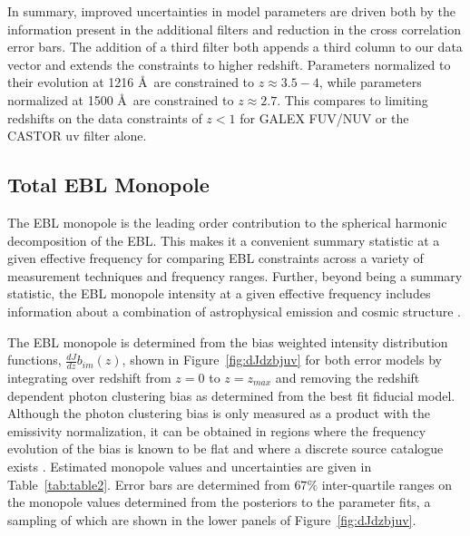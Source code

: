 \documentclass[fleqn,usenatbib]{mnras}
\begin{document}
In summary, improved uncertainties in model parameters are driven both by the information present in the additional filters and reduction in the cross correlation error bars. The addition of a third filter both appends a third column to our data vector and extends the constraints to higher redshift. Parameters normalized to their evolution at 1216 \AA\ are constrained to $z\approx 3.5-4$, while parameters normalized at 1500 \AA\ are constrained to $z\approx 2.7$. This compares to limiting redshifts on the data constraints of $z<1$ for {\small GALEX} FUV/NUV or the {\small CASTOR} uv filter alone. 



\subsection{Total EBL Monopole} 
\label{EBL}


The EBL monopole is the leading order contribution to the spherical harmonic decomposition of the EBL. This makes it a convenient summary statistic at a given effective frequency for comparing EBL constraints across a variety of measurement techniques and frequency ranges.  Further, beyond being a summary statistic, the EBL monopole intensity at a given effective frequency includes information about a combination of astrophysical emission and cosmic structure \citep{Hill2018}. 

The EBL monopole is determined from the bias weighted intensity distribution functions, $\frac{dJ}{dz}b_{im} (z)$, shown in Figure~\ref{fig:dJdzbjuv} for both error models by integrating over redshift from $z = 0$ to $z = z_{max}$ and removing the redshift dependent photon clustering bias as determined from the best fit fiducial model. Although the photon clustering bias is only measured as a product with the emissivity normalization, it can be obtained in regions where the frequency evolution of the bias is known to be flat and where a discrete source catalogue exists \citep{Chiang_2019}. Estimated monopole values and uncertainties are given in Table~\ref{tab:table2}. Error bars are determined from $67\%$ inter-quartile ranges on the monopole values determined from the posteriors to the parameter fits, a sampling of which are shown in the lower panels of Figure~\ref{fig:dJdzbjuv}. 
\end{document}
